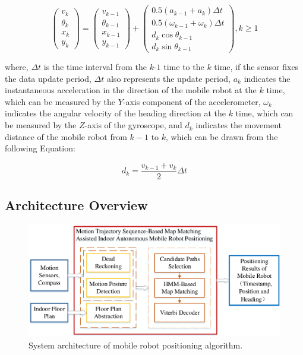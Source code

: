 \documentclass{llncs}
\begin{document}
\begin{equation}
\label{equ_dr}
\left( {\begin{array}{*{20}{c}}
	{{v_k}}\\
	{{\theta _k}}\\
	{{x_k}}\\
	{{y_k}}
	\end{array}} \right) = \left( {\begin{array}{*{20}{c}}
	{{v_{k - 1}}}\\
	{{\theta _{k - 1}}}\\
	{{x_{k - 1}}}\\
	{{y_{k - 1}}}
	\end{array}} \right) + \left( {\begin{array}{*{20}{c}}
	{0.5({a_{k - 1}} + {a_k})\Delta t}\\
	{0.5({\omega _{k - 1}} + {\omega _k})\Delta t}\\
	{{d_k}\cos {\theta _{k - 1}}}\\
	{{d_k}\sin {\theta _{k - 1}}}
	\end{array}} \right),k \ge 1
\end{equation}

where, $\Delta t$ is the time interval from the $k$-$1$ time to the $k$ time, if the sensor fixes the data update period, $\Delta t$ also represents the update period, ${a_k}$ indicates the instantaneous acceleration in the direction of the mobile robot at the $k$ time, which can be measured by the $Y$-axis component of the accelerometer, ${\omega _k}$ indicates the angular velocity of the heading direction at the $k$ time, which can be measured by the $Z$-axis of the gyroscope, and $d_k$ indicates the movement distance of the mobile robot from $k-1$ to $k$, which can be drawn from the following Equation:

\begin{equation}
\label{equ_distance}
{d_k} = \frac{{{v_{k - 1}} + {v_k}}}{2}\Delta t
\end{equation}


\subsection{Architecture Overview}

\begin{figure}[!htbp]
	\centering
	\includegraphics[width=4.8in]{RobotMatch-Architecture}
	\caption{System architecture of mobile robot positioning algorithm.}
	\label{fig-architect}
\end{figure}
\end{document}

